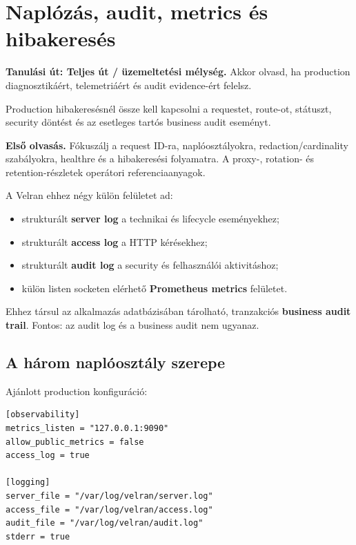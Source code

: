 \chapter{Naplózás, audit, metrics és hibakeresés}

\noindent\textbf{Tanulási út: Teljes út / üzemeltetési mélység.} Akkor olvasd, ha production diagnosztikáért, telemetriáért és audit evidence-ért felelsz.\par\medskip


Production hibakeresésnél össze kell kapcsolni a requestet, route-ot, státuszt, security döntést és az esetleges tartós business audit eseményt.

\noindent\textbf{Első olvasás.} Fókuszálj a request ID-ra, naplóosztályokra, redaction/cardinality szabályokra, healthre és a hibakeresési folyamatra. A proxy-, rotation- és retention-részletek operátori referenciaanyagok.\par\medskip

A Velran ehhez négy külön felületet ad:

\begin{itemize}
  \item strukturált \textbf{server log} a technikai és lifecycle eseményekhez;
  \item strukturált \textbf{access log} a HTTP kérésekhez;
  \item strukturált \textbf{audit log} a security és felhasználói aktivitáshoz;
  \item külön listen socketen elérhető \textbf{Prometheus metrics} felületet.
\end{itemize}

Ehhez társul az alkalmazás adatbázisában tárolható, tranzakciós \textbf{business audit trail}. Fontos: az audit log és a business audit nem ugyanaz.

\section{A három naplóosztály szerepe}

Ajánlott production konfiguráció:

\begin{lstlisting}
[observability]
metrics_listen = "127.0.0.1:9090"
allow_public_metrics = false
access_log = true

[logging]
server_file = "/var/log/velran/server.log"
access_file = "/var/log/velran/access.log"
audit_file = "/var/log/velran/audit.log"
stderr = true
\end{lstlisting}

